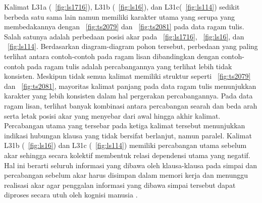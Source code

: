 Kalimat L31a (\pic~\ref{fig:ls1716}), L31b (\pic~\ref{fig:ls16}), dan L31c(\pic~\ref{fig:ls114}) sedikit berbeda satu sama lain namun memiliki karakter utama yang serupa yang membedakannya dengan \pic~\ref{fig:ts2079} dan \pic~\ref{fig:ts2081} pada data ragam tulis. Salah satunya adalah perbedaan posisi akar pada \pic~\ref{fig:ls1716}, \pic~\ref{fig:ls16}, dan \pic~\ref{fig:ls114}. Berdasarkan diagram-diagram pohon tersebut, perbedaan yang paling terlihat antara contoh-contoh pada ragam lisan dibandingkan dengan contoh-contoh pada ragam tulis adalah percabangannya yang terlihat lebih tidak konsisten. Meskipun tidak semua kalimat memiliki struktur seperti \pic~\ref{fig:ts2079} dan \pic~\ref{fig:ts2081}, mayoritas kalimat panjang pada data ragam tulis menunjukkan karakter yang lebih konsisten dalam hal pergerakan percabangannya. Pada data ragam lisan, terlihat banyak kombinasi antara percabangan searah dan beda arah serta letak posisi akar yang menyebar dari awal hingga akhir kalimat. Percabangan utama yang tersebar pada ketiga kalimat tersebut menunjukkan indikasi hubungan klausa yang tidak bersifat berlanjut, namun paralel. Kalimat L31b (\pic~\ref{fig:ls16}) dan L31c (\pic~\ref{fig:ls114}) memiliki percabangan utama sebelum akar sehingga secara kolektif membentuk relasi dependensi utama yang negatif. Hal ini berarti seluruh informasi yang dibawa oleh klausa-klausa pada simpai dan percabangan sebelum akar harus disimpan dalam memori kerja dan menunggu realisasi akar agar penggalan informasi yang dibawa simpai tersebut dapat diproses secara utuh oleh kognisi manusia \citep{hawkins2014cross}.

